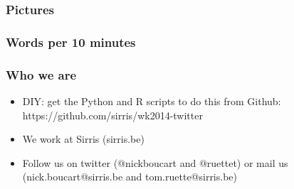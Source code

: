 \documentclass{beamer}
\begin{document}
  \begin{frame}
    \frametitle{Pictures}
    
  \end{frame}

  \begin{frame}
    \frametitle{Words per 10 minutes}
    
  \end{frame}
  

  \begin{frame}
    \frametitle{Who we are}
    \begin{itemize}
       \item DIY: get the Python and R scripts to do this from Github: https://github.com/sirris/wk2014-twitter
       \item We work at Sirris (sirris.be)
       \item Follow us on twitter (@nickboucart and @ruettet) or mail us (nick.boucart@sirris.be and tom.ruette@sirris.be)
    \end{itemize}
  \end{frame}
 
\end{document}

